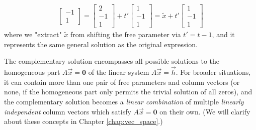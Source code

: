 {\begin{align*}
\begin{bmatrix}
-1 \\
1
\end{bmatrix}
=
\begin{bmatrix}
2 \\
-1 \\
1
\end{bmatrix}
+
t'
\begin{bmatrix}
1 \\
-1 \\
1
\end{bmatrix}
= \tilde{x} + t'
\begin{bmatrix}
1 \\
-1 \\
1
\end{bmatrix}
\end{align*}
where we "extract" $\tilde{x}$ from shifting the free parameter via $t' = t-1$, and it represents the same general solution as the original expression.}
\par
The complementary solution encompasses all possible solutions to the homogeneous part $A\vec{x} = \textbf{0}$ of the linear system $A\vec{x} = \vec{h}$. For broader situations, it can contain more than one pair of free parameters and column vectors (or none, if the homogeneous part only permits the trivial solution of all zeros), and the complementary solution becomes a \textit{linear combination} of multiple \textit{linearly independent} column vectors which satisfy $A\vec{x} = \textbf{0}$ on their own. (We will clarify about these concepts in Chapter \ref{chap:vec_space}.)\par
